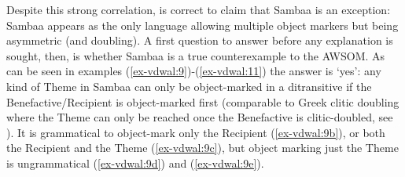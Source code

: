 \documentclass[output=paper
,modfonts
,nonflat]{langsci/langscibook}
\begin{document}
Despite this strong correlation, \citet{Riedel2009} is correct to claim that Sambaa is an exception: Sambaa appears as the only language allowing multiple object markers but being asymmetric (and doubling). A first question to answer before any explanation is sought, then, is whether Sambaa is a true counterexample to the AWSOM. As can be seen in examples (\ref{ex-vdwal:9})-(\ref{ex-vdwal:11}) the answer is ‘yes’: any kind of Theme in Sambaa can only be object-marked in a ditransitive if the Benefactive/Recipient is object-marked first (comparable to Greek clitic doubling where the Theme can only be reached once the Benefactive is clitic-doubled, see \citealt{Anagnostopoulou2003, Anagnostopoulou2014}).
It is grammatical to object-mark only the Recipient (\ref{ex-vdwal:9b}), or both the Recipient and the Theme (\ref{ex-vdwal:9c}), but object marking just the Theme is ungrammatical (\ref{ex-vdwal:9d}) and (\ref{ex-vdwal:9e}).
\end{document}
